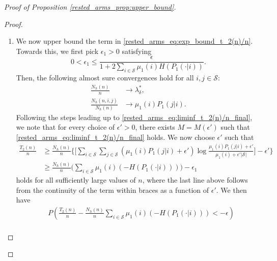 \begin{proof}[Proof of Proposition \ref{rested_arms_prop:upper_bound}]
\begin{proof}
\begin{enumerate}
\item We now upper bound the term in \eqref{rested_arms_eq:exp_bound_t_2(n)/n}. Towards this, we first pick $\epsilon_1>0$ satisfying
\begin{equation}
	0<\epsilon_1\leq \frac{\epsilon}{1+2\sum\limits_{i\in\mathcal{S}}\mu_1(i)H(P_1(\cdot|i))}.\label{rested_arms_eq:epsilon_1}
\end{equation}
Then, the following almost sure convergences hold for all $i,j\in\mathcal{S}$:
\begingroup\allowdisplaybreaks\begin{align}
\frac{N_h(n)}{n}&\to \lambda_\delta^*,\nonumber\\
\frac{N_h(n,i,j)}{N_h(n)}&\to \mu_1(i)P_1(j|i).	
\end{align}\endgroup
Following the steps leading up to \eqref{rested_arms_eq:liminf_t_2(n)/n_final}, we note that for every choice of $\epsilon'>0$, there exists $M=M(\epsilon')$ such that \eqref{rested_arms_eq:liminf_t_2(n)/n_final} holds. We now choose $\epsilon'$ such that
\begingroup\allowdisplaybreaks\begin{align}
	\frac{T_{2}(n)}{n}
    	&\geq \frac{N_h(n)}{n}\bigg\lbrace\bigg[\sum\limits_{i\in\mathcal{S}}\sum\limits_{j\in\mathcal{S}}(\mu_1(i)P_1(j|i)+\epsilon')
    	\log\frac{\mu_1(i)P_1(j|i)+\epsilon'}{\mu_1(i)+\epsilon'|\mathcal{S}|}\bigg]-\epsilon'\bigg\rbrace\nonumber\\
    	&\geq \frac{N_h(n)}{n}\bigg(\sum\limits_{i\in\mathcal{S}}\mu_1(i)(-H(P_1(\cdot|i)))\bigg)-\epsilon_1
\end{align}\endgroup
holds for all sufficiently large values of $n$, where the last line above follows from the continuity of the term within braces as a function of $\epsilon'$. We then have
\begingroup\allowdisplaybreaks\begin{align}
	&P\left(\frac{T_2(n)}{n}-\frac{N_h(n)}{n}\sum\limits_{i\in\mathcal{S}}\mu_1(i)(-H(P_1(\cdot|i)))<-\epsilon\right)\nonumber\\

\end{align}
\end{enumerate}
\end{proof}
\end{proof}
